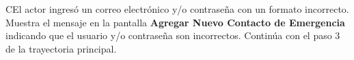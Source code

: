  \begin{UCtrayectoriaA}{C}{El actor ingresó un correo electrónico y/o contraseña con un formato incorrecto.}
    \UCpaso[\UCsist] Muestra el mensaje  en la pantalla \textbf{Agregar Nuevo Contacto de Emergencia} indicando que el usuario y/o contraseña son incorrectos.
    \UCpaso[] Continúa con el paso 3 de la trayectoria principal.
 \end{UCtrayectoriaA} 


 


